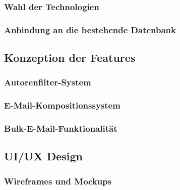 \documentclass[11pt,a4paper]{article}
\begin{document}
\subsubsection{Wahl der Technologien}

\subsubsection{Anbindung an die bestehende Datenbank}

\subsection{Konzeption der Features}

\subsubsection{Autorenfilter-System}

\subsubsection{E-Mail-Kompositionssystem}

\subsubsection{Bulk-E-Mail-Funktionalität}

\subsection{UI/UX Design}

\subsubsection{Wireframes und Mockups}
\end{document}
